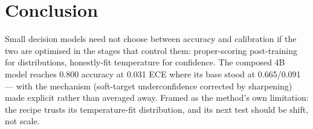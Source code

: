 \section{Conclusion}

Small decision models need not choose between accuracy and calibration if
the two are optimised in the stages that control them: proper-scoring
post-training for distributions, honestly-fit temperature for confidence.
The composed 4B model reaches 0.800 accuracy at 0.031 ECE where its base
stood at 0.665/0.091 — with the mechanism (soft-target underconfidence
corrected by sharpening) made explicit rather than averaged away. Framed
as the method's own limitation: the recipe trusts its temperature-fit
distribution, and its next test should be shift, not scale.





